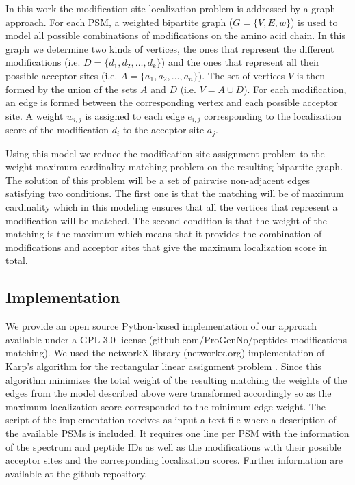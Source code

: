 \documentclass[]{article}
\begin{document}
In this work the modification site localization problem is addressed by a graph approach. For each PSM, a weighted  bipartite graph ($G = \{V,E,w\}$) is used to model all possible combinations of modifications on the amino acid chain. In this graph we determine two kinds of vertices, the ones that represent the different modifications (i.e. $D = \{d_1, d_2, \dots, d_k\}$) and the ones that represent all their possible acceptor sites (i.e. $A = \{a_1, a_2, \dots, a_n\}$). The set of vertices $V$ is then formed by the union of the sets $A$ and $D$ (i.e. $V = A \cup D$). For each modification, an edge is formed between the corresponding vertex and each possible acceptor site. A weight $w_{i,j}$ is assigned to each edge $e_{i,j}$ corresponding to the localization score of the modification $d_i$ to the acceptor site $a_j$.

Using this model we reduce the modification site assignment problem to the    weight maximum cardinality matching problem on the resulting bipartite graph. The solution of this problem will be a set of pairwise non-adjacent edges satisfying two conditions. The first one is that the matching will be of maximum cardinality which in this modeling ensures that all the vertices that represent a modification will be matched. The second condition is that the weight of the matching is the maximum which means that it provides the combination of modifications and acceptor sites that give the maximum localization score in total.


\subsection{Implementation}

We provide an open source Python-based implementation of our approach available under a GPL-3.0 license (github.com/ProGenNo/peptides-modifications-matching). We used the networkX library (networkx.org) implementation of Karp's algorithm for the rectangular linear assignment problem \cite{Karp_assignment}. Since this algorithm minimizes the total weight of the resulting matching the weights of the edges from the model described above were transformed accordingly so as the maximum localization score corresponded to the minimum edge weight. The script of the implementation receives as input a text file where a description of the available PSMs is included. It requires one line per PSM with the information of the spectrum and peptide IDs as well as the modifications with their possible acceptor sites and the corresponding localization scores. Further information are available at the github repository.
\end{document}
